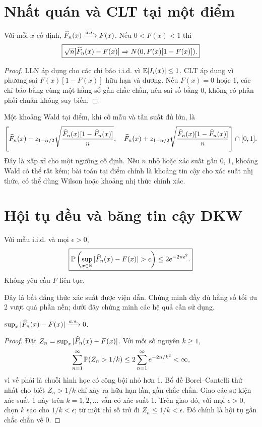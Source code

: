 \section{Nhất quán và CLT tại một điểm}
\begin{proposition}
Với mỗi $x$ cố định, $\widehat F_n(x)\xrightarrow{a.s.}F(x)$. Nếu
$0<F(x)<1$ thì
\[
\boxed{\sqrt n[\widehat F_n(x)-F(x)]\Rightarrow
N(0,F(x)[1-F(x)]).}
\]
\end{proposition}
\begin{proof}
LLN áp dụng cho các chỉ báo i.i.d. vì $\mathbb E|I_i(x)|\leq1$.
CLT áp dụng vì phương sai $F(x)[1-F(x)]$ hữu hạn và dương.
Nếu $F(x)=0$ hoặc 1, các chỉ báo bằng cùng một hằng số gần chắc chắn,
nên sai số bằng 0, không có phân phối chuẩn không suy biến.
\end{proof}
Một khoảng Wald tại điểm, khi cỡ mẫu và tần suất đủ lớn, là
\[
\left[\widehat F_n(x)-z_{1-\alpha/2}
\sqrt{\frac{\widehat F_n(x)[1-\widehat F_n(x)]}{n}},\quad
\widehat F_n(x)+z_{1-\alpha/2}
\sqrt{\frac{\widehat F_n(x)[1-\widehat F_n(x)]}{n}}\right]\cap[0,1].
\]
Đây là xấp xỉ cho một ngưỡng cố định. Nếu $n$ nhỏ hoặc xác suất gần 0, 1,
khoảng Wald có thể rất kém; bài toán tại điểm chính là khoảng tin cậy
cho xác suất nhị thức, có thể dùng Wilson hoặc khoảng nhị thức chính xác.

\section{Hội tụ đều và băng tin cậy DKW}
\begin{theorem}
Với mẫu i.i.d. và mọi $\epsilon>0$,
\[
\boxed{\Pp\left(\sup_{x\in\R}|\Fhat(x)-F(x)|>\epsilon\right)
\leq 2e^{-2n\epsilon^2}.}
\]
Không yêu cầu $F$ liên tục.
\end{theorem}
Đây là bất đẳng thức xác suất được viện dẫn. Chứng minh đầy đủ hằng số
tối ưu 2 vượt quá phần nền; dưới đây chứng minh các hệ quả cần sử dụng.

\begin{theorem}
$\sup_x|\widehat F_n(x)-F(x)|\xrightarrow{a.s.}0$.
\end{theorem}
\begin{proof}
Đặt $Z_n=\sup_x|\widehat F_n(x)-F(x)|$. Với mỗi số nguyên $k\geq1$,
\[
\sum_{n=1}^\infty\mathbb P(Z_n>1/k)
\leq2\sum_{n=1}^\infty e^{-2n/k^2}<\infty,
\]
vì vế phải là chuỗi hình học có công bội nhỏ hơn 1.
Bổ đề Borel--Cantelli thứ nhất cho biết $Z_n>1/k$ chỉ xảy ra hữu hạn
lần, gần chắc chắn. Giao các sự kiện xác suất 1 này trên $k=1,2,\ldots$
vẫn có xác suất 1. Trên giao đó, với mọi $\epsilon>0$, chọn $k$ sao cho
$1/k<\epsilon$; từ một chỉ số trở đi $Z_n\leq1/k<\epsilon$.
Đó chính là hội tụ gần chắc chắn về 0.
\end{proof}

